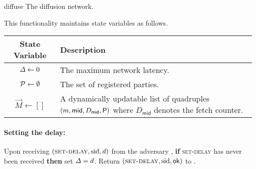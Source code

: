 \begin{cccFunctionality}
      {\funcDiffuse}
      {diffuse}
      {The diffusion network.}

      \newcommand*{\msgid}{\ensuremath{\mathsf{mid}}\xspace}
      \newcommand*{\vecM}{\ensuremath{\vec{M}}\xspace}

      This functionality maintains state variables as follows.

      \begin{minipage}{\linewidth}
            \begin{tabularx}{.9\textwidth}{c  X}
                  \toprule[.3mm]
                  \textbf{State Variable}
                   & \textbf{Description}
                  \\ \midrule[.3mm]
                  $\varDelta \gets 0$
                   & The maximum network latency.
                  \\ \midrule
                  $\mathcal{P} \gets \emptyset$
                   & The set of registered parties.
                  \\ \midrule
                  $\vecM \gets [] $
                   & A dynamically updatable list of quadruples $(m, \msgid, D_{\msgid}, \party)$ where $D_{\msgid}$ denotes the fetch counter.
                  \\ \bottomrule[.3mm]
            \end{tabularx}
            \addtocounter{table}{-1}
      \end{minipage}

      \medskip
      \paragraph{Setting the delay:}
      \begin{cccItemize}[nosep]
            \item Upon  receiving $(\textsc{set-delay}, \mathrm{sid}, d)$ from the adversary \adv, \textbf{if} \textsc{set-delay} has never been received \textbf{then} set $\varDelta = d$. Return $(\textsc{set-delay}, \mathrm{sid}, \mathsf{ok})$ to \adv.
      \end{cccItemize}


\end{cccFunctionality}
